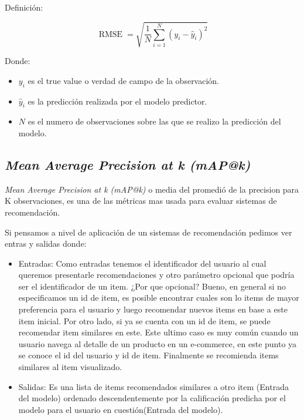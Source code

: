 \documentclass[11pt,a4paper,twoside]{thesis}
\begin{document}
\begin{description}
	\item[Definición:]
\end{description}
\begin{equation}
	\operatorname{RMSE}=\sqrt{  \frac{1}{N} \sum_{i=1}^N (y_i - \hat y_i)^2}
\end{equation}
\begin{description}
	\item[Donde:]
\end{description}
\begin{itemize}
	\item $y_i$ es el true value o verdad de campo de la observación.
	\item $\hat y_i$ es la predicción realizada por el modelo predictor.
	\item $N$ es el numero de observaciones sobre las que se realizo la predicción del modelo.
\end{itemize}

\subsection{\textit{Mean Average Precision at k (mAP@k)}}

\textit{Mean Average Precision at k (mAP@k)} o media del promedió de la precision para K observaciones, es una de las métricas mas usada para evaluar sistemas de recomendación.

Si pensamos a nivel de aplicación de un sistemas de recomendación pedimos ver entras y salidas donde:


\begin{itemize}
\item Entradas: Como entradas tenemos el identificador del usuario al cual queremos presentarle recomendaciones y otro parámetro opcional que podría ser el identificador de un item. ¿Por que opcional? Bueno, en general si no especificamos un id de item, es posible encontrar cuales son lo items de mayor preferencia para el usuario y luego recomendar nuevos items en base a este item inicial. Por otro lado, si ya se cuenta con un id de item, se puede recomendar item similares en este. Este ultimo caso es muy común cuando un usuario navega al detalle de un producto en un e-commerce, en este punto ya se conoce el id del usuario y id de item. Finalmente se recomienda items similares al item visualizado.
\item Salidas: Es una lista de items recomendados similares a otro item (Entrada del modelo) ordenado descendentemente por la calificación predicha por el modelo para el usuario en cuestión(Entrada del modelo). 
\end{itemize}
\end{document}
